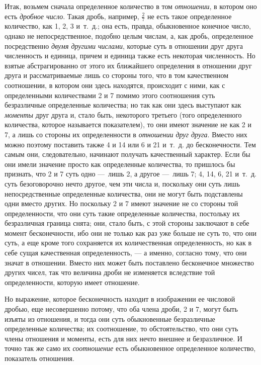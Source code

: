{Итак, возьмем сначала определенное количество в том
{\em отношении}, в котором оно есть
{\em дробное число}. Такая дробь, например,  $\frac 2
7$  не есть такое определенное количество, как 1, 2, 3 и~т.~д.; она есть,
правда, обыкновенное конечное число, однако не непосредственное, подобно
целым числам, а, как дробь, определенное посредственно
{\em двумя другими числами}, которые суть в отношении
друг друга численность и единица, причем и единица также есть некоторая
численность. Но взятые абстрагированно от этого их ближайшего определения в
отношении друг друга и рассматриваемые лишь со стороны того, что в том
качественном соотношении, в котором они здесь находятся, происходит с ними,
как с определенными количествами 2 и 7 помимо этого соотношения суть
безразличные определенные количества; но так как они здесь выступают как
{\em моменты} друг друга и, стало быть, некоторого
третьего (того определенного количества, которое называется показателем),
то они имеют значение не как 2 и 7, а лишь со стороны их определенности в
{\em отношении друг друга}. Вместо них можно поэтому
поставить также 4 и 14 или 6 и 21 и~т.~д. до бесконечности. Тем самым они,
следовательно, начинают получать качественный характер. Если бы они имели
значение просто как определенные количества, то пришлось бы признать, что 2
и 7 суть одно —~лишь 2, а другое —~лишь 7; 4, 14, 6, 21 и~т.~д. суть
безоговорочно нечто другое, чем эти числа и, поскольку они суть лишь
непосредственные определенные количества, они не могут быть подставлены
одни вместо других. Но поскольку 2 и 7 имеют значение не со стороны той
определенности, что они суть такие определенные количества, постольку их
безразличная граница снята; они, стало быть, с этой стороны заключают в
себе момент бесконечности, ибо они не только как раз уже больше не суть то,
что они суть, а еще кроме того сохраняется их количественная
определенность, но как в себе сущая качественная определенность, — а
именно, согласно тому, что они значат в отношении. Вместо них может быть
поставлено бесконечное множество других чисел, так что величина дроби не
изменяется вследствие той определенности, которую имеет отношение.

Но выражение, которое бесконечность находит в изображении ее числовой
дробью, еще несовершенно потому, что оба члена дроби, 2 и 7, могут быть
изъяты из отношения, и тогда они суть обыкновенные безразличные
определенные количества; их соотношение, то обстоятельство, что они суть
члены отношения и моменты, есть для них нечто внешнее и безразличное. И
точно так же само их {\em соотношение} есть
обыкновенное определенное количество, показатель отношения.

}
